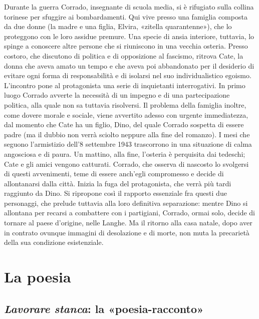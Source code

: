 \documentclass[a4paper, twoside, titlepage]{book}
\begin{document}
Durante la guerra Corrado, insegnante di scuola media, si è rifugiato sulla collina torinese per sfuggire ai bombardamenti. Qui vive presso una famiglia composta da due donne (la madre e una figlia, Elvira, «zitella quarantenne»), che lo proteggono con le loro assidue premure. Una specie di ansia interiore, tuttavia, lo spinge a conoscere altre persone che si riuniscono in una vecchia osteria. Presso costoro, che discutono di politica e di opposizione al fascismo, ritrova Cate, la donna che aveva amato un tempo e che aveva poi abbandonato per il desiderio di evitare ogni forma di responsabilità e di isolarsi nel suo individualistico egoismo. L'incontro pone al protagonista una serie di inquietanti interrogativi. In primo luogo Corrado avverte la necessità di un impegno e di una partecipazione politica, alla quale non sa tuttavia risolversi. Il problema della famiglia inoltre, come dovere morale e sociale, viene avvertito adesso con urgente immediatezza, dal momento che Cate ha un figlio, Dino, del quale Corrado sospetta di essere padre (ma il dubbio non verrà sciolto neppure alla fine del romanzo). I mesi che seguono l'armistizio dell'8 settembre 1943 trascorrono in una situazione di calma angosciosa e di paura. Un mattino, alla fine, l'osteria è perquisita dai tedeschi; Cate e gli amici vengono catturati. Corrado, che osserva di nascosto lo svolgersi di questi avvenimenti, teme di essere anch'egli compromesso e decide di allontanarsi dalla città. Inizia la fuga del protagonista, che verrà più tardi raggiunto da Dino. Si ripropone così il rapporto essenziale fra questi due personaggi, che prelude tuttavia alla loro definitiva separazione: mentre Dino si allontana per recarsi a combattere con i partigiani, Corrado, ormai solo, decide di tornare al paese d'origine, nelle Langhe. Ma il ritorno alla casa natale, dopo aver in contrato ovunque immagini di desolazione e di morte, non muta la precarietà della sua condizione esistenziale.

\section{La poesia}

\subsection{\textit{Lavorare stanca}: la «poesia-racconto»}
\end{document}
